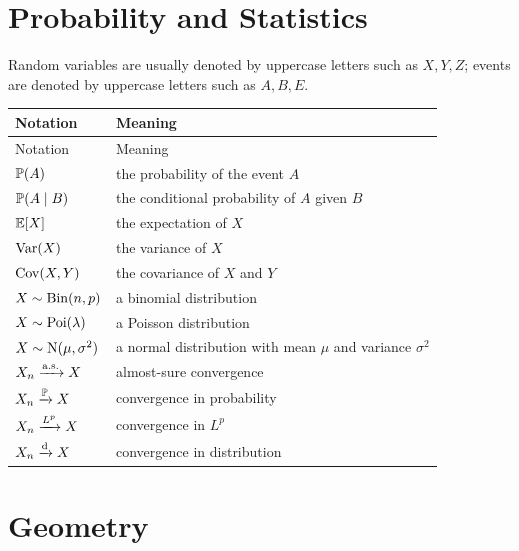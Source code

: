     \section*{Probability and Statistics}

    Random variables are usually denoted by uppercase letters such as $X,Y,Z$;
    events are denoted by uppercase letters such as $A,B,E$.

    \vspace{0.5em}

    {\small
    \renewcommand{\arraystretch}{1.18}
    \begin{longtable}{@{}L{0.27\textwidth}L{0.65\textwidth}@{}}
        \toprule
        Notation & Meaning \\
        \midrule
        \endfirsthead

        \toprule
        Notation & Meaning \\
        \midrule
        \endhead

        \bottomrule
        \endlastfoot

        $\mathbb{P}(A)$ & the probability of the event $A$ \\
        $\mathbb{P}(A\mid B)$ & the conditional probability of $A$ given $B$ \\
        $\mathbb{E}[X]$ & the expectation of $X$ \\
        $\operatorname{Var}(X)$ & the variance of $X$ \\
        $\operatorname{Cov}(X,Y)$ & the covariance of $X$ and $Y$ \\
        $X\sim\operatorname{Bin}(n,p)$ & a binomial distribution \\
        $X\sim\operatorname{Poi}(\lambda)$ & a Poisson distribution \\
        $X\sim\operatorname{N}(\mu,\sigma^2)$ & a normal distribution with mean $\mu$ and variance $\sigma^2$ \\
        $X_n\xrightarrow{\mathrm{a.s.}} X$ & almost-sure convergence \\
        $X_n\xrightarrow{\mathbb{P}} X$ & convergence in probability \\
        $X_n\xrightarrow{L^{p}}X$ & convergence in $L^p$ \\
        $X_n\xrightarrow{\mathrm{d}} X$ & convergence in distribution \\
    \end{longtable}
    }

    \section*{Geometry}

